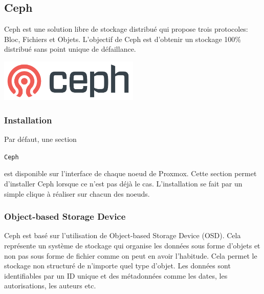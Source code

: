 \documentclass[12pt]{article}
\begin{document}
\subsection{Ceph}
\noindent%
\begin{minipage}{.7\textwidth}%
\gls{Ceph} est une solution libre de stockage distribué qui propose trois protocoles: Bloc, Fichiers et Objets.
L'objectif de \gls{Ceph} est d'obtenir un stockage 100\% distribué sans point unique de défaillance.

\end{minipage}%
\hfill
\begin{minipage}{.3\textwidth}%
\begin{center}
\includegraphics[width=0.5\textwidth]{src/logo_ceph.png}
\end{center}
\end{minipage}%

\subsubsection{Installation}
Par défaut, une section \begin{code}\texttt{\gls{Ceph}}\end{code} est disponible sur l'interface de chaque noeud de \gls{Proxmox}. 
Cette section permet d'installer \gls{Ceph} lorsque ce n'est pas déjà le cas.
L'installation se fait par un simple clique à réaliser sur chacun des noeuds.

\subsubsection{Object-based Storage Device}
\gls{Ceph} est basé sur l'utilisation de Object-based Storage Device (\gls{OSD}).
Cela représente un système de stockage qui organise les données sous forme d'objets et non pas sous forme de fichier comme on peut en avoir l'habitude.
Cela permet le stockage non structuré de n'importe quel type d'objet.
Les données sont identifiables par un ID unique et des métadonnées comme les dates, les autorisations, les auteurs etc.
\end{document}
